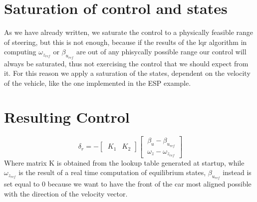 \section{Saturation of control and states}
As we have already written, we saturate the control to a physically feasible range of steering, but this is not enough, because if the results of the lqr algorithm in computing $\omega_{z_{ref}}$ or $\beta_{u_{ref}}$ are out of any phisycally possible range our control will always be saturated, thus not exercising the control that we should expect from it. For this reason we apply a saturation of the states, dependent on the velocity of the vehicle, like the one implemented in the ESP example.
\section{Resulting Control}
\begin{equation} \label{Resulting Control}
	\ \delta_{r} = -
	\begin{bmatrix}
	\ K_{1} & K_{2}
	\end{bmatrix}
	\begin{bmatrix}
	\ \beta_{u}-\beta_{u_{ref}} \\
	\ \omega_{z}-\omega_{z_{ref}}
	\end{bmatrix}
\end{equation}
Where matrix K is obtained from the lookup table generated at startup, while $\omega_{z_{ref}}$ is the result of a real time computation of equilibrium states, $\beta_{u_{ref}}$ instead is set equal to 0 because we want to have the front of the car most aligned possible with the direction of the velocity vector.
